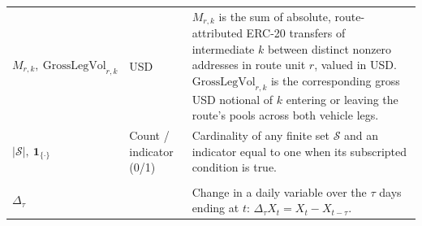 \begin{tabularx}{\linewidth}{@{}>{\raggedright\arraybackslash}Xl>{\raggedright\arraybackslash}X@{}}
$M_{r,k},\ \mathrm{GrossLegVol}_{r,k}$ & USD & $M_{r,k}$ is the sum of absolute, route-attributed ERC-20 transfers of intermediate $k$ between distinct nonzero addresses in route unit $r$, valued in USD. $\mathrm{GrossLegVol}_{r,k}$ is the corresponding gross USD notional of $k$ entering or leaving the route's pools across both vehicle legs. \\
$|\mathcal{S}|,\ \mathbf{1}_{\{\cdot\}}$ & Count / indicator (0/1) & Cardinality of any finite set $\mathcal S$ and an indicator equal to one when its subscripted condition is true. \\
\addlinespace
\multicolumn{3}{@{}l}{\textit{Dynamic operators}} \\
$\Delta_{\tau}$ &  & Change in a daily variable over the $\tau$ days ending at $t$: $\Delta_\tau X_t=X_t-X_{t-\tau}$. \\
\bottomrule
\end{tabularx}
\par\medskip
